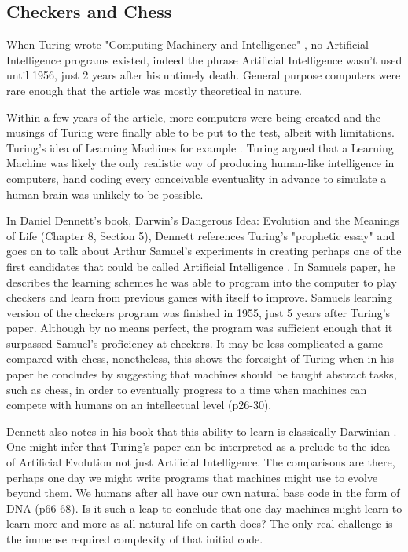 \documentclass{scrartcl}
\begin{document}
\subsection{Checkers and Chess}

When Turing wrote "Computing Machinery and Intelligence" \cite{turing1950computing:1}, no Artificial Intelligence programs existed, indeed the phrase Artificial Intelligence wasn't used until 1956, just 2 years after his untimely death. General purpose computers were rare enough that the article was mostly theoretical in nature. \par
Within a few years of the article, more computers were being created and the musings of Turing were finally able to be put to the test, albeit with limitations. Turing's idea of Learning Machines for example \cite{ramscar2010computing:9}. Turing argued that a Learning Machine was likely the only realistic way of producing human-like intelligence in computers, hand coding every conceivable eventuality in advance to simulate a human brain was unlikely to be possible. 

In Daniel Dennett's book, Darwin's Dangerous Idea: Evolution and the Meanings of Life \cite{dennett1996darwin:10} (Chapter 8, Section 5), Dennett references Turing's "prophetic essay" and goes on to talk about Arthur Samuel's experiments in creating perhaps one of the first candidates that could be called Artificial Intelligence \cite{samuel2000some:11}. In Samuels paper, he describes the learning schemes he was able to program into the computer to play checkers and learn from previous games with itself to improve. Samuels learning version of the checkers program was finished in 1955, just 5 years after Turing's paper. Although by no means perfect, the program was sufficient enough that it surpassed Samuel's proficiency at checkers. It may be less complicated a game compared with chess, nonetheless, this shows the foresight of Turing when in his paper he concludes by suggesting that machines should be taught abstract tasks, such as chess, in order to eventually progress to a time when machines can compete with humans on an intellectual level \cite{dawkins2016selfish:12} (p26-30). 

Dennett also notes in his book that this ability to learn is classically Darwinian \cite{darwin2009origin:13}. One might infer that Turing's paper can be interpreted as a prelude to the idea of Artificial Evolution not just Artificial Intelligence. The comparisons are there, perhaps one day we might write programs that machines might use to evolve beyond them. We humans after all have our own natural base code in the form of DNA \cite{dawkins2016selfish:12} (p66-68). Is it such a leap to conclude that one day machines might learn to learn more and more as all natural life on earth does? The only real challenge is the immense required complexity of that initial code.
\end{document}
